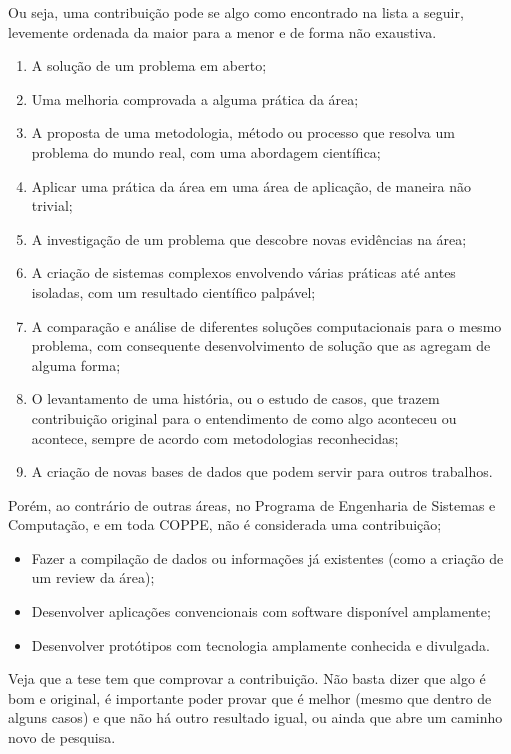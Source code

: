 Ou seja, uma contribuição pode se algo como encontrado na lista a seguir, levemente ordenada da maior para a menor e de forma não exaustiva.
\begin{enumerate}
\item	A solução de um problema em aberto;
\item	Uma melhoria comprovada a alguma prática da área;
\item	A proposta de uma metodologia, método ou processo que resolva um problema do mundo real, com uma abordagem científica;
\item	Aplicar uma prática da área em uma área de aplicação, de maneira não trivial;
\item	A investigação de um problema que descobre novas evidências na área;
\item	A criação de sistemas complexos envolvendo várias práticas até antes isoladas, com um resultado científico palpável;
\item	A comparação e análise de diferentes soluções computacionais para o mesmo problema, com consequente desenvolvimento de solução que as agregam de alguma forma;
\item	O levantamento de uma história, ou o estudo de casos, que trazem contribuição original para o entendimento de como algo aconteceu ou acontece, sempre de acordo com metodologias reconhecidas;
\item	A criação de novas bases de dados que podem servir para outros trabalhos.
\end{enumerate}

Porém, ao contrário de outras áreas, no Programa de Engenharia de Sistemas e Computação, e em toda COPPE, não é considerada uma contribuição;
\begin{itemize}
    \item 	Fazer a compilação de dados ou informações já existentes (como a criação de um review da área);
    \item	Desenvolver aplicações convencionais com software disponível amplamente;
    \item 	Desenvolver protótipos com tecnologia amplamente conhecida e divulgada.

\end{itemize}

Veja que a tese tem que comprovar a contribuição. Não basta dizer que algo é bom e original, é importante poder provar que é melhor (mesmo que dentro de alguns casos) e que não há outro resultado igual, ou ainda que abre um caminho novo de pesquisa.


